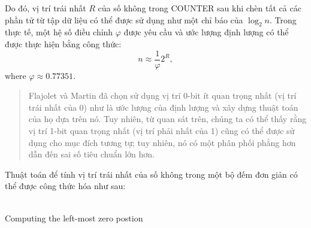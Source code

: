 \documentclass[a4paper,13pt]{article}
\theoremstyle{mytheor}
\begin{document}
Do đó, vị trí trái nhất $R$ của số không trong COUNTER sau khi chèn tất cả các phần tử từ tập dữ liệu có thể được sử dụng như một chỉ báo của $\log_2n$. 
Trong thực tế, một hệ số điều chỉnh $\varphi$ được yêu cầu và ước lượng định lượng có thể được thực hiện bằng công thức:
\[
    n \approx \frac{1}{\varphi}2^R,
\]
\vspace{0.4cm}
where $\varphi\approx0.77351.$\\
\vspace{0.4cm}
\begin{quote}
    Flajolet và Martin đã chọn sử dụng vị trí 0-bit ít quan trọng nhất (vị trí trái nhất của 0) như là ước lượng của định lượng và xây dựng thuật toán 
    của họ dựa trên nó. Tuy nhiên, từ quan sát trên, chúng ta có thể thấy rằng vị trí 1-bit quan trọng nhất (vị trí phải nhất của 1) cũng có thể 
    được sử dụng cho mục đích tương tự; tuy nhiên, nó có một phân phối phẳng hơn dẫn đến sai số tiêu chuẩn lớn hơn.\\
\end{quote}
\indent Thuật toán để tính vị trí trái nhất của số không trong một bộ đếm đơn giản có thể được công thức hóa như sau:\\\\
\begin{algorithm}[H]
    \DontPrintSemicolon
    \LinesNumberedHidden
    \caption[]{Computing the left-most zero postion}
    \newline
\end{algorithm}
\vspace{0.4cm}
\end{document}
